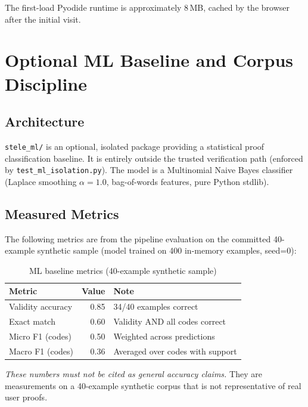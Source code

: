\documentclass[11pt,a4paper]{article}
\theoremstyle{definition}
\theoremstyle{plain}
\begin{document}
The first-load Pyodide runtime is approximately 8\,MB, cached
by the browser after the initial visit.

\section{Optional ML Baseline and Corpus Discipline}
\label{sec:ml}

\subsection{Architecture}

\texttt{stele\_ml/} is an optional, isolated package providing
a statistical proof classification baseline.
It is entirely outside the trusted verification path
(enforced by \texttt{test\_ml\_isolation.py}).
The model is a Multinomial Naive Bayes classifier (Laplace
smoothing $\alpha{=}1.0$, bag-of-words features, pure Python
stdlib).

\subsection{Measured Metrics}

The following metrics are from the pipeline evaluation on the
committed 40-example synthetic sample (model trained on 400
in-memory examples, seed=0):

\begin{table}[H]
\centering
\caption{ML baseline metrics (40-example synthetic sample)}
\begin{tabular}{@{}lrl@{}}
\toprule
Metric & Value & Note \\
\midrule
Validity accuracy & 0.85 & 34/40 examples correct \\
Exact match & 0.60 & Validity AND all codes correct \\
Micro F1 (codes) & 0.50 & Weighted across predictions \\
Macro F1 (codes) & 0.36 & Averaged over codes with support \\
\bottomrule
\end{tabular}
\end{table}

\emph{These numbers must not be cited as general accuracy
claims.}
They are measurements on a 40-example synthetic corpus that
is not representative of real user proofs.
\end{document}
